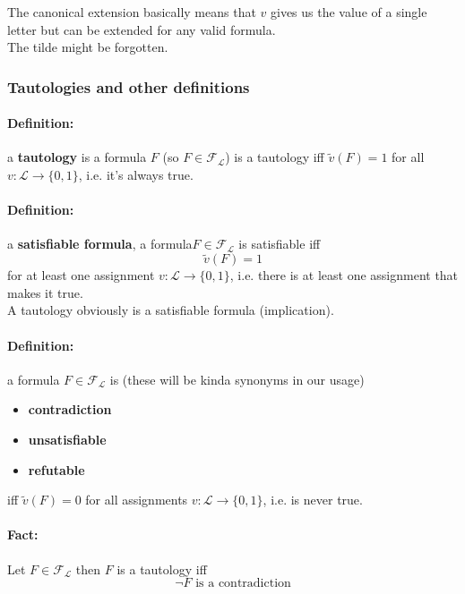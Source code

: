 \documentclass[11pt]{article}
\begin{document}
	
	\nn
	
	The canonical extension basically means that $v$ gives us the value of a single letter but can be extended for any valid formula.\\
	The tilde might be forgotten.\\
	
	\newpage
	
	\subsubsection{Tautologies and other definitions}
	\paragraph{Definition:} a \textbf{tautology} is a formula $F$ (so $F \in \mathcal{F}_\mathcal{L}$) is a tautology iff $\tilde{v} (F) = 1$ for all $v: \mathcal{L} \rightarrow \{0,1\}$, i.e. it's always true.\\
	
	\paragraph{Definition:} a \textbf{satisfiable formula}, a formula$ F \in \mathcal{F}_\mathcal{L}$ is satisfiable iff
	$$ \tilde{v} (F) = 1 $$ 
	for at least one assignment $v: \mathcal{L} \rightarrow \{0,1\}$, i.e. there is at least one assignment that makes it true.\\
	
	A tautology obviously is a satisfiable formula (implication). \\
	
	\paragraph{Definition:} a formula $F \in \mathcal{F}_\mathcal{L}$ is (these will be kinda synonyms in our usage)
	\begin{itemize}
		\item \textbf{contradiction}
		\item \textbf{unsatisfiable}
		\item \textbf{refutable}
	\end{itemize}
	iff $\tilde{v} (F) = 0$ for all assignments $v : \mathcal{L} \rightarrow \{0,1\}$, i.e. is never true.\\
	
	\paragraph{Fact:} Let $F \in \mathcal{F}_\mathcal{L}$ then $F$ is a tautology iff 
	$$ \neg F \text{ is a contradiction}$$
	
\end{document}
